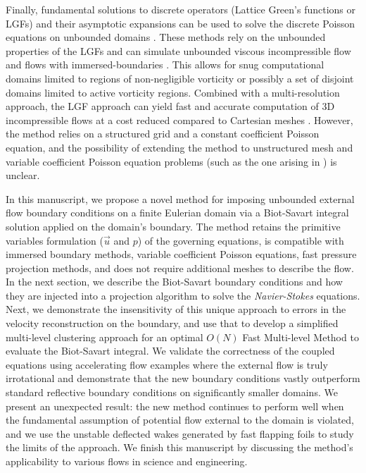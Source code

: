 \documentclass[final,1p,times]{elsarticle}
\begin{document}
Finally, fundamental solutions to discrete operators (Lattice Green's functions or LGFs) and their asymptotic expansions can be used to solve the discrete Poisson equations on unbounded domains \cite{Liska2014AEquations, Beckers2022PlanarGrids}. 
These methods rely on the unbounded properties of the LGFs and can simulate unbounded viscous incompressible flow \cite{Liska2016ADomains} and flows with immersed-boundaries \cite{Liska2017AFunctions}. This allows for snug computational domains limited to regions of non-negligible vorticity or possibly a set of disjoint domains limited to active vorticity regions. Combined with a multi-resolution approach, the LGF approach can yield fast and accurate computation of 3D incompressible flows at a cost reduced compared to Cartesian meshes \cite{Dorschner2020AEquations}. However, the method relies on a structured grid and a constant coefficient Poisson equation, and the possibility of extending the method to unstructured mesh and variable coefficient Poisson equation problems (such as the one arising in \cite{Lauber2022}) is unclear.

In this manuscript, we propose a novel method for imposing unbounded external flow boundary conditions on a finite Eulerian domain via a Biot-Savart integral solution applied on the domain's boundary.
The method retains the primitive variables formulation ($\vec u$ and $p$) of the governing equations, is compatible with immersed boundary methods, variable coefficient Poisson equations, fast pressure projection methods, and does not require additional meshes to describe the flow. In the next section, we describe the Biot-Savart boundary conditions and how they are injected into a projection algorithm to solve the \emph{Navier-Stokes} equations. Next, we demonstrate the insensitivity of this unique approach to errors in the velocity reconstruction on the boundary, and use that to develop a simplified multi-level clustering approach for an optimal $O(N)$ Fast Multi-level Method to evaluate the Biot-Savart integral. We validate the correctness of the coupled equations using accelerating flow examples where the external flow is truly irrotational and demonstrate that the new boundary conditions vastly outperform standard reflective boundary conditions on significantly smaller domains. We present an unexpected result: the new method continues to perform well when the fundamental assumption of potential flow external to the domain is violated, and we use the unstable deflected wakes generated by fast flapping foils to study the limits of the approach. We finish this manuscript by discussing the method's applicability to various flows in science and engineering.
\end{document}
